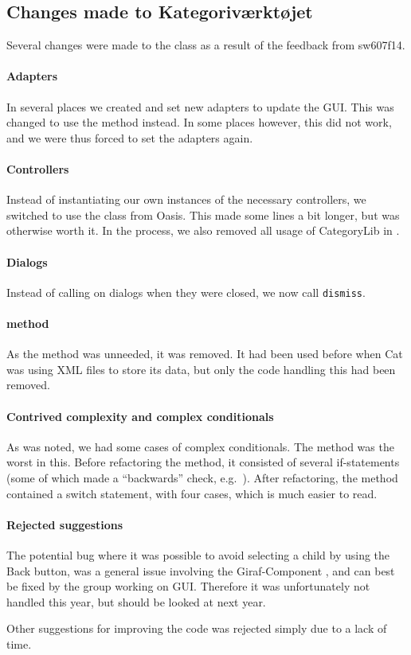 \subsection{Changes made to Kategoriværktøjet}\label{subsec:collab_catresult}
Several changes were made to the class  as a result of the feedback from sw607f14.

\paragraph{Adapters}
In several places we created and set new adapters to update the GUI. This was changed to use the  method instead. In some places however, this did not work, and we were thus forced to set the adapters again.

\paragraph{Controllers}
Instead of instantiating our own instances of the necessary controllers, we switched to use the  class from Oasis. This made some lines a bit longer, but was otherwise worth it. In the process, we also removed all usage of CategoryLib in .

\paragraph{Dialogs}
Instead of calling  on dialogs when they were closed, we now call \texttt{dismiss}.

\paragraph{ method}
As the  method was unneeded, it was removed. It had been used before when Cat was using XML files to store its data, but only the code handling this had been removed.

\paragraph{Contrived complexity and complex conditionals}
As was noted, we had some cases of complex conditionals. The  method was the worst in this. Before refactoring the method, it consisted of several if-statements (some of which made a ``backwards'' check, e.g.\ ). After refactoring, the method contained a switch statement, with four cases, which is much easier to read.

\paragraph{Rejected suggestions}
The potential bug where it was possible to avoid selecting a child by using the Back button, was a general issue involving the Giraf-Component , and can best be fixed by the group working on GUI. Therefore it was unfortunately not handled this year, but should be looked at next year.

Other suggestions for improving the code was rejected simply due to a lack of time.